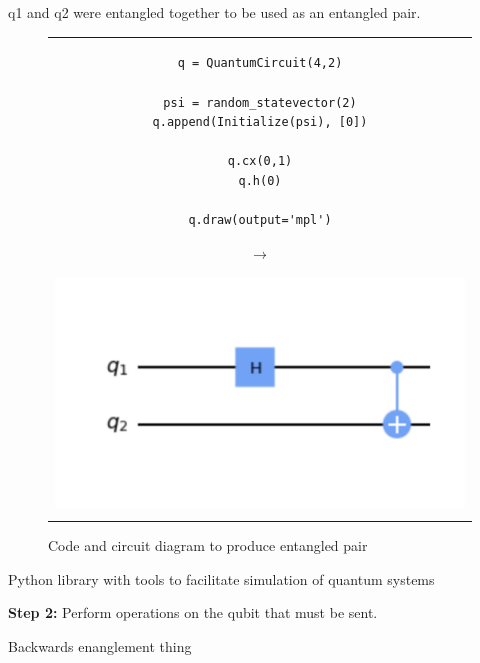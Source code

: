 q1 and q2 were entangled together to be used as an entangled pair.
\begin{figure}[h]
\centering
\begin{tabular}{c}
\begin{minipage}[c]{.45\linewidth}
\begin{verbatim}
q = QuantumCircuit(4,2)

psi = random_statevector(2)
q.append(Initialize(psi), [0])

q.cx(0,1)
q.h(0)

q.draw(output='mpl')
\end{verbatim}
\end{minipage}
\begin{minipage}[c]{.1\linewidth}
\centering
$\rightarrow$
\end{minipage}
\begin{minipage}[c]{.4\linewidth}
\centering
\includegraphics[width=\textwidth]{lab3/images/Step1.png}
\end{minipage}\\
\\ %
\end{tabular}
\caption{Code and circuit diagram to produce entangled pair}
\label{step1}
\end{figure}

Python library with tools to facilitate simulation of quantum systems

\textbf{Step 2:} Perform operations on the qubit that must be sent.

Backwards enanglement thing

